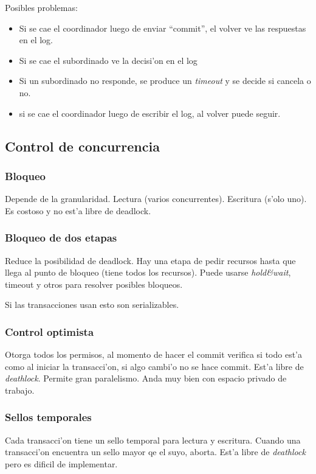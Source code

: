 \documentclass[a4paper,spanish]{article}
\begin{document}
Posibles problemas:
\begin{itemize}
	\item Si se cae el coordinador luego de enviar ``commit'', el volver
ve las respuestas en el log.
	\item Si se cae el subordinado ve la decisi'on en el log
	\item Si un subordinado no responde, se produce un \emph{timeout} y se
decide si cancela o no.
	\item si se cae el coordinador luego de escribir el log, al volver
puede seguir.
\end{itemize}

\subsection{Control de concurrencia}
\subsubsection{Bloqueo}
Depende de la granularidad. Lectura (varios concurrentes). Escritura (s'olo
uno). Es costoso y no est'a libre de deadlock.

\subsubsection*{Bloqueo de dos etapas}
Reduce la posibilidad de deadlock. Hay una etapa de pedir recursos hasta que
llega al punto de bloqueo (tiene todos los recursos). Puede usarse
\emph{hold\&wait}, timeout y otros para resolver posibles bloqueos.

Si las transacciones usan esto son serializables.

\subsubsection{Control optimista}
Otorga todos los permisos, al momento de hacer el commit verifica si todo est'a
como al iniciar la transacci'on, si algo cambi'o no se hace commit. Est'a libre
de \emph{deathlock}. Permite gran paralelismo. Anda muy bien con espacio
privado de trabajo.

\subsubsection{Sellos temporales}
Cada transacci'on tiene un sello temporal para lectura y escritura. Cuando una
transacci'on encuentra un sello mayor qe el suyo, aborta. Est'a libre de
\emph{deathlock} pero es dificil de implementar.
\end{document}
